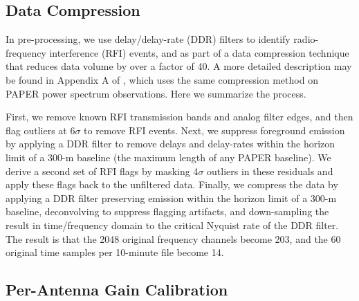 \documentclass[preprint]{aastex}
\begin{document}
\subsection{Data Compression}

In pre-processing, we use delay/delay-rate (DDR) filters
\citep{Parsons:2009p7859} to identify radio-frequency interference (RFI)
events, and as part of a data compression technique that reduces data volume by
over a factor of 40.  A more detailed description may be found in Appendix A of
\cite{Parsons2013b}, which uses the same compression method on PAPER power
spectrum observations. Here we summarize the process.

First, we remove known RFI transmission bands and analog filter edges, and then
flag outliers at 6$\sigma$ to remove RFI events.  Next, we suppress foreground
emission by applying a DDR filter to remove delays and delay-rates within the
horizon limit of a 300-m baseline (the maximum length of any PAPER baseline).
We derive a second set of RFI flags by masking 4$\sigma$ outliers in these
residuals and apply these flags back to the unfiltered data.  Finally, we
compress the data by applying a DDR filter preserving emission within the
horizon limit of a 300-m baseline, deconvolving to suppress flagging artifacts,
and down-sampling the result in time/frequency domain to the critical Nyquist
rate of the DDR filter.  The result is that the 2048 original frequency
channels become 203, and the 60 original time samples per 10-minute file become
14. 



\subsection{Per-Antenna Gain Calibration}
\end{document}
